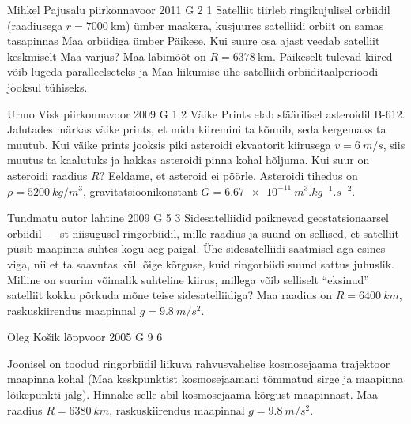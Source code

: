 \documentclass[11pt]{article}
\begin{document}
{%
{Mihkel Pajusalu} %
{piirkonnavoor} %
{2011} %
{G 2} %
{1} %
{
\ifStatement
Satelliit tiirleb ringikujulisel orbiidil (raadiusega $r=\SI{7000}{\kilo\metre}$) ümber maakera, kusjuures satelliidi orbiit on samas tasapinnas Maa orbiidiga ümber Päikese. Kui suure osa ajast veedab satelliit keskmiselt Maa varjus? Maa läbimõõt on $R=\SI{6378}{\kilo\metre}$. Päikeselt tulevad kiired võib lugeda paralleelseteks ja Maa liikumise ühe satelliidi orbiiditaalperioodi jooksul tühiseks.
\fi
}

{Urmo Visk} %
{piirkonnavoor} %
{2009} %
{G 1} %
{2} %
{
\ifStatement
Väike Prints elab sfäärilisel asteroidil B-612. Jalutades märkas väike prints, et mida kiiremini ta kõnnib, seda kergemaks ta muutub. Kui väike prints jooksis piki asteroidi ekvaatorit kiirusega $v = \SI{6}{m/s}$, siis muutus ta kaalutuks ja hakkas asteroidi pinna kohal hõljuma. Kui suur on asteroidi raadius $R$? Eeldame, et asteroid ei pöörle. Asteroidi tihedus on $\rho = \SI{5200}{kg/m^3}$, gravitatsioonikonstant $G = \SI{6.67e-11}{m^3.kg^{-1}.s^{-2}}$.
\fi
}

{Tundmatu autor} %
{lahtine} %
{2009} %
{G 5} %
{3} %
{
\ifStatement
Sidesatelliidid paiknevad geostatsionaarsel orbiidil --- st niisugusel ringorbiidil, mille raadius ja suund on sellised, et satelliit püsib maapinna suhtes kogu aeg paigal. Ühe sidesatelliidi saatmisel aga esines viga, nii et ta saavutas küll õige kõrguse, kuid ringorbiidi suund sattus juhuslik. Milline on suurim võimalik suhteline kiirus, millega võib selliselt \enquote{eksinud} satelliit kokku põrkuda mõne teise sidesatelliidiga? Maa raadius on $R = \SI{6400}{km}$, raskuskiirendus maapinnal $g = \SI{9,8}{m/s^2}$.
\fi
}

{Oleg Košik} %
{lõppvoor} %
{2005} %
{G 9} %
{6} %
{
\ifStatement
Joonisel on toodud ringorbiidil liikuva rahvusvahelise kosmosejaama trajektoor maapinna kohal (Maa keskpunktist kosmosejaamani tõmmatud sirge ja maapinna lõikepunkti jälg). Hinnake selle abil kosmosejaama kõrgust maapinnast. Maa raadius $R = \SI{6380}{km}$, raskuskiirendus maapinnal $g = \SI{9,8}{m/s^2}$.

}}
\end{document}
